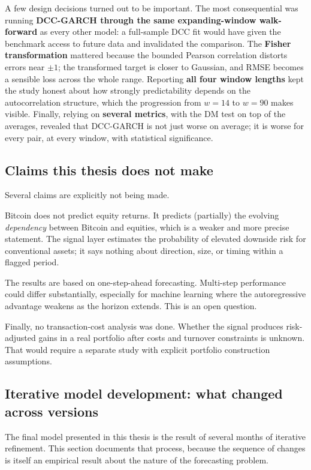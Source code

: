 A few design decisions turned out to be important. The most consequential was running \textbf{DCC-GARCH through the same expanding-window walk-forward} as every other model: a full-sample DCC fit would have given the benchmark access to future data and invalidated the comparison. The \textbf{Fisher transformation} mattered because the bounded Pearson correlation distorts errors near $\pm 1$; the transformed target is closer to Gaussian, and RMSE becomes a sensible loss across the whole range. Reporting \textbf{all four window lengths} kept the study honest about how strongly predictability depends on the autocorrelation structure, which the progression from $w=14$ to $w=90$ makes visible. Finally, relying on \textbf{several metrics}, with the DM test on top of the averages, revealed that DCC-GARCH is not just worse on average; it is worse for every pair, at every window, with statistical significance.

\subsection{Claims this thesis does not make}

Several claims are explicitly not being made.

Bitcoin does not predict equity returns. It predicts (partially) the evolving \emph{dependency} between Bitcoin and equities, which is a weaker and more precise statement. The signal layer estimates the probability of elevated downside risk for conventional assets; it says nothing about direction, size, or timing within a flagged period.

The results are based on one-step-ahead forecasting. Multi-step performance could differ substantially, especially for machine learning where the autoregressive advantage weakens as the horizon extends. This is an open question.

Finally, no transaction-cost analysis was done. Whether the signal produces risk-adjusted gains in a real portfolio after costs and turnover constraints is unknown. That would require a separate study with explicit portfolio construction assumptions.

\subsection{Iterative model development: what changed across versions}
\label{subsec:iterations}

The final model presented in this thesis is the result of several months of iterative refinement.
This section documents that process, because the sequence of changes is itself an
empirical result about the nature of the forecasting problem.

